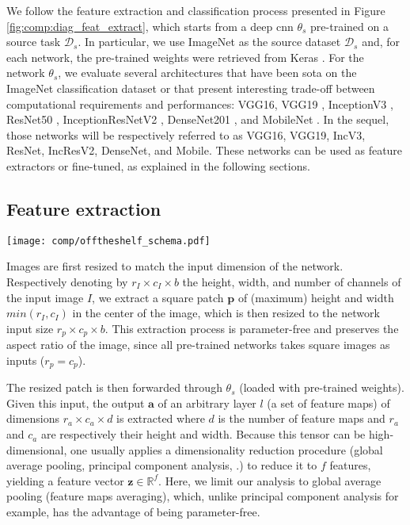 We follow the feature extraction and classification process presented in Figure \ref{fig:comp:diag_feat_extract}, which starts from a deep \acrlong{cnn} $\theta_s$ pre-trained on a source task $\mathcal{D}_s$. In particular, we use ImageNet as the source dataset $\mathcal{D}_s$ and, for each network, the pre-trained weights were retrieved from Keras \cite{chollet2015keras}. For the network $\theta_s$, we evaluate several architectures that have been \acrlong{sota} on the ImageNet classification dataset \cite{deng2009imagenet} or that present interesting trade-off between computational requirements and performances: VGG16, VGG19 \cite{simonyan2014very}, InceptionV3 \cite{szegedy2016rethinking}, ResNet50 \cite{he2016deep}, InceptionResNetV2 \cite{szegedy2017inception}, DenseNet201 \cite{huang2017densely}, and MobileNet \cite{howard2017mobilenets}. In the sequel, those networks will be respectively referred to as VGG16, VGG19, IncV3, ResNet, IncResV2, DenseNet, and Mobile. These networks can be used as feature extractors or fine-tuned, as explained in the following sections.

\subsection{Feature extraction}
\label{ssec:comp:feature_extr}

\begin{figure*}
    \center
    \texttt{[image: comp/offtheshelf\_schema.pdf]}
    \caption{Feature extraction from pre-trained convolutional neural networks}
    \label{fig:comp:diag_feat_extract}
\end{figure*}

Images are first resized to match the input dimension of the network. Respectively denoting by $r_I \times c_I \times b$ the height, width, and number of channels of the input image $I$, we extract a square patch $\mathbf{p}$ of (maximum) height and width $min\left(r_I, c_I\right)$ in the center of the image, which is then resized to the network input size $r_p\times c_p\times b$. This extraction process is parameter-free and preserves the aspect ratio of the image, since all pre-trained networks takes square images as inputs (\ie $r_p=c_p$).

The resized patch is then forwarded through $\theta_s$ (loaded with pre-trained weights). Given this input, the output $\mathbf{a}$ of an arbitrary layer $l$ (\ie a set of feature maps) of dimensions $r_a \times c_a \times d$ is extracted where $d$ is the number of feature maps and $r_a$ and $c_a$ are respectively their height and width. Because this tensor can be high-dimensional, one usually applies a dimensionality reduction procedure (\eg global average pooling, principal component analysis, \etc.) to reduce it to $f$ features, yielding a feature vector $\mathbf{z} \in \mathbb{R}^f$.  Here, we limit our analysis to global average pooling (\ie feature maps averaging), which, unlike principal component analysis for example, has the advantage of being parameter-free.

